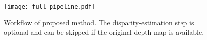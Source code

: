 \begin{figure}[!h]
	\begin{minipage}[b]{1.0\linewidth}
		\centering
		\centerline{ \texttt{[image: full\_pipeline.pdf]} }
	\end{minipage}
    \caption{ Workflow of proposed method. The disparity-estimation step is
        optional and can be skipped if the original depth map is available. }
	\label{fig:full}
\end{figure}
